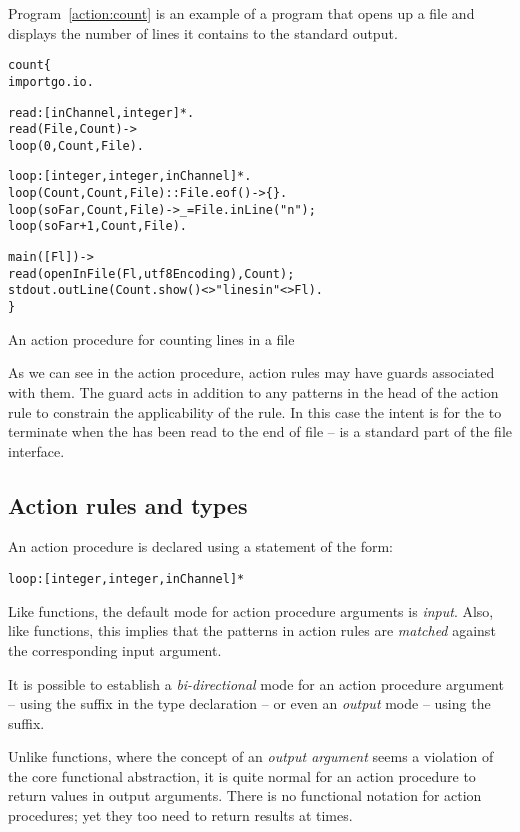 Program~\ref{action:count} is an example of a program that opens up a file and displays the number of lines it contains to the standard output.
\begin{program}[tb]
\vspace{0.5ex}
\begin{alltt}
count\{
  import go.io.
  
  read:[inChannel,integer]*.
  read(File,Count) -> 
      loop(0,Count, File).
  
  loop:[integer,integer,inChannel]*.
  loop(Count,Count,File) :: File.eof() -> \{\}.
  loop(soFar,Count,File) -> _ = File.inLine("\bsl{}n"); 
      loop(soFar+1,Count,File).
     
   main([Fl]) ->
      read(openInFile(Fl,utf8Encoding),Count);
      stdout.outLine(Count.show()<>" lines in "<>Fl).
\}
\end{alltt}
\vspace{-2ex}
\caption{An action procedure for counting lines in a file\label{action:count}}
\end{program}

As we can see in the  action procedure, action rules may have guards associated with them. The guard acts in addition to any patterns in the head of the action rule to constrain the applicability of the rule. In this case the intent is for the  to terminate when the  has been read to the end of file --  is a standard part of the file interface.

\subsection{Action rules and types}
\label{action:types}
An action procedure is declared using a statement of the form:
\begin{alltt}
loop:[integer,integer,inChannel]*
\end{alltt}
Like functions, the default mode for action procedure arguments is \emph{input}. Also, like functions, this implies that the patterns in action rules are \emph{matched} against the corresponding input argument.

It is possible to establish a \emph{bi-directional} mode for an action procedure argument -- using the \q{-+} suffix in the type declaration -- or even an \emph{output} mode -- using the \q{-} suffix.

\begin{aside}
Unlike functions, where the concept of an \emph{output argument} seems a  violation of the core functional abstraction, it is quite normal for an action procedure to return values in output arguments. There is no functional notation for action procedures; yet they too need to return results at times.
\end{aside}

